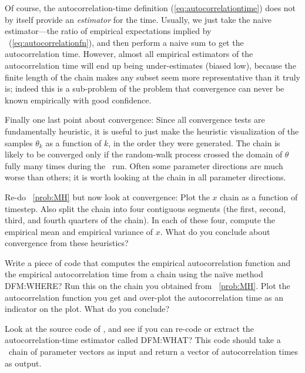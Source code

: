 \documentclass[12pt,twoside,pdftex]{article}
\newcommand{\MCMC}{\acronym{MCMC}}
\newcommand{\pars}{\theta}
\begin{document}
Of course, the autocorrelation-time definition
(\ref{eq:autocorrelationtime}) does not by itself provide an
\emph{estimator} for the time.
Usually, we just take the naive estimator---the ratio of empirical
expectations implied by \equationname~(\ref{eq:autocorrelationfn}),
and then perform a naive sum to get the autocorrelation time.
However, almost all empirical estimators of the autocorrelation time
will end up being under-estimates (biased low), because the finite
length of the chain makes any subset seem more representative than it
truly is; indeed this is a sub-problem of the problem that convergence
can never be known empirically with good confidence.

Finally one last point about convergence:
Since all convergence tests are fundamentally heuristic, it is useful
to just make the heuristic visualization of the samples $\pars_k$ as a
function of $k$, in the order they were generated.
The chain is likely to be converged only if the random-walk process
crossed the domain of $\pars$ fully many times during the \MCMC\ run.
Often some parameter directions are much worse than others; it is
worth looking at the chain in all parameter directions.

\begin{problem}
Re-do \problemname~\ref{prob:MH} but now look at convergence:
Plot the $x$ chain as a function of timestep.  Also split the chain
into four contiguous segments (the first, second, third, and fourth
quarters of the chain).  In each of these four, compute the empirical
mean and empirical variance of $x$.  What do you conclude about
convergence from these heuristics?
\end{problem}

\begin{problem}\label{prob:estimatetau}
Write a piece of code that computes the empirical autocorrelation
function and the empirical autocorrelation time from a chain using the na\"ive method DFM:WHERE?  Run
this on the chain you obtained from \problemname~\ref{prob:MH}.
Plot the autocorrelation function you get and over-plot the
autocorrelation time as an indicator on the plot.  What do you
conclude?
\end{problem}

\begin{problem}
Look at the source code of  \citep{emcee}, and see if you can
re-code or extract the autocorrelation-time estimator called DFM:WHAT?
This code should take a \MCMC\ chain of parameter vectors as input and
return a vector of autocorrelation times as output.
\end{problem}
\end{document}
